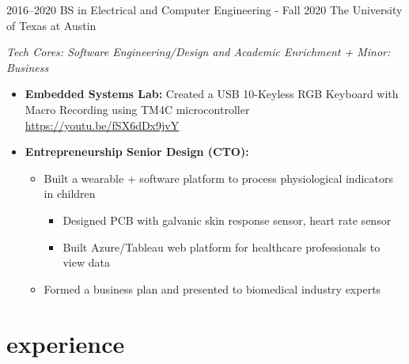 \documentclass[]{friggeri-cv} %
\begin{document}
\begin{entrylist}

	\entry
	{2016--2020}
	{BS in Electrical and Computer Engineering - Fall 2020}
	{The University of Texas at Austin}
	{
		\emph{Tech Cores: Software Engineering/Design and Academic Enrichment + 
		Minor: Business}
		\begin{itemize}
			\item \textbf{Embedded Systems Lab:} Created a USB 10-Keyless RGB Keyboard with Macro Recording using TM4C microcontroller \href{https://youtu.be/fSX6dDx9jvY}{https://youtu.be/fSX6dDx9jvY}
			\item \textbf{Entrepreneurship Senior Design (CTO):}
			\begin{itemize}
				\item Built a wearable + software platform to process physiological indicators in children
				\begin{itemize}
					\item Designed PCB with galvanic skin response sensor, heart rate sensor
					\item Built Azure/Tableau web platform for healthcare professionals to view data
				\end{itemize}
				\item Formed a business plan and presented to biomedical industry experts 
			\end{itemize}
		\end{itemize}
	}
	
\end{entrylist}


\vspace{-5pt}
\vspace{-5pt}
\section{experience}
\vspace{-10pt}
\end{document}
